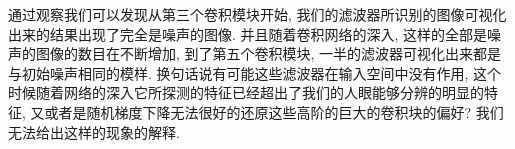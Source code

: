 \documentclass[lang=cn,11pt]{elegantpaper}
\begin{document}
通过观察我们可以发现从第三个卷积模块开始, 我们的滤波器所识别的图像可视化出来的结果出现了完全是噪声的图像. 并且随着卷积网络的深入, 这样的全部是噪声的图像的数目在不断增加, 到了第五个卷积模块, 一半的滤波器可视化出来都是与初始噪声相同的模样. 换句话说有可能这些滤波器在输入空间中没有作用, 这个时候随着网络的深入它所探测的特征已经超出了我们的人眼能够分辨的明显的特征, 又或者是随机梯度下降无法很好的还原这些高阶的巨大的卷积块的偏好? 我们无法给出这样的现象的解释.






\newpage
\nocite{*}



\end{document}
